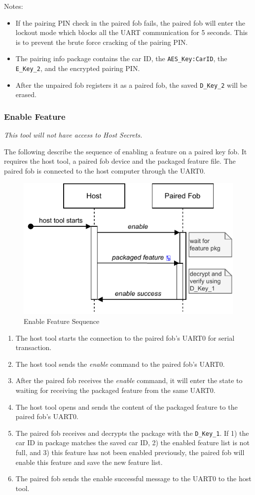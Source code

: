 \documentclass[11pt,oneside,onecolumn,letterpaper]{article}
\begin{document}
Notes:
\begin{itemize}
	\item If the pairing PIN check in the paired fob fails, the paired fob will enter the lockout mode which blocks all the UART communication for 5 seconds. This is to prevent the brute force cracking of the pairing PIN.
	\item The pairing info package contains the car ID, the \verb|AES_Key:CarID|, the \verb|E_Key_2|, and the encrypted pairing PIN.
	\item After the unpaired fob registers it as a paired fob, the saved \verb|D_Key_2| will be erased.
\end{itemize}

\subsubsection{Enable Feature}

\textit{This tool will not have access to Host Secrets.}

The following describe the sequence of enabling a feature on a paired key fob. It requires the host tool, a paired fob device and the packaged feature file. The paired fob is connected to the host computer through the UART0.

\begin{figure}[!htbp]
	\begin{centering}
		\includegraphics[width = .5\textwidth]{pic/enable.pdf}
		\caption{Enable Feature Sequence}
		\label{fig:enable}
	\end{centering}
\end{figure}

\begin{enumerate}
	\item The host tool starts the connection to the paired fob's UART0 for serial transaction.
	\item The host tool sends the \textit{enable} command to the paired fob's UART0.
	\item After the paired fob receives the \textit{enable} command, it will enter the state to waiting for receiving the packaged feature from the same UART0.
	\item The host tool opens and sends the content of the packaged feature to the paired fob's UART0.
	\item The paired fob receives and decrypts the package with the \verb|D_Key_1|. If 1) the car ID in package matches the saved car ID, 2) the enabled feature list is not full, and 3) this feature has not been enabled previously, the paired fob will enable this feature and save the new feature list.
	\item The paired fob sends the enable successful message to the UART0 to the host tool.
\end{enumerate}
\end{document}
